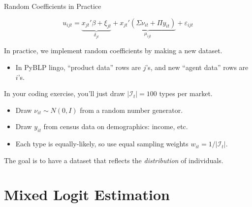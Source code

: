 \documentclass[aspectratio=169,t,11pt,table]{beamer}
\begin{document}
\begin{frame}{Random Coefficients in Practice}
    \vspace{-\baselineskip}
    \begin{minipage}[c][4\baselineskip][c]{\textwidth}
        \begin{equation*}
            u_{ijt} = \underbrace{x_{jt}'\beta + \xi_{jt}}_{\textstyle\delta_{jt}} + \underbrace{x_{jt}'(\Sigma \nu_{it} + \Pi y_{it})}_{\textstyle\mu_{ijt}} + \varepsilon_{ijt}
        \end{equation*}
    \end{minipage}
    \vspace{-0.5\baselineskip}
    \begin{wideitemize}
        \item In practice, we implement random coefficients by making a new dataset.
        \begin{itemize}
            \item In PyBLP lingo, ``product data'' rows are $j$'s, and new ``agent data'' rows are $i$'s.
        \end{itemize}
        \pause
        \item In your coding exercise, you'll just draw $|\mathcal{I}_t| = 100$ types per market.
        \begin{itemize}
            \item Draw $\nu_{it} \sim N(0, I)$ from a random number generator.
            \item Draw $y_{it}$ from census data on demographics: income, etc.
            \item Each type is equally-likely, so use equal sampling weights $w_{it} = 1 / |\mathcal{I}_t|$.
        \end{itemize}
        \pause
        \item The goal is to have a dataset that reflects the \textit{distribution} of individuals.
    \end{wideitemize}
\end{frame}

\section{Mixed Logit Estimation}
\end{document}
